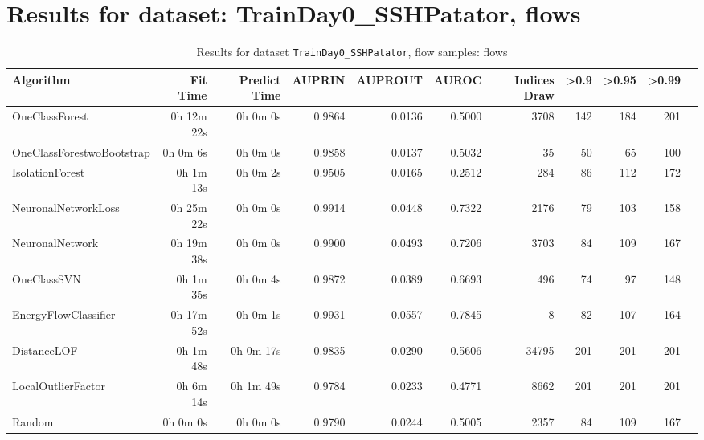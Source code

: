\documentclass{article}
\begin{document}
\section*{Results for dataset: TrainDay0_SSHPatator, flows}
\begin{table}[h!]
\centering
\caption{Results for dataset \texttt{TrainDay0_SSHPatator}, flow samples: flows}
\label{tab:trainday0sshpatator_flows}
\begin{tabular}{lrrrrrrrrrr}
\toprule
Algorithm & Fit Time & Predict Time & AUPRIN & AUPROUT & AUROC & Indices Draw & >0.9 & >0.95 & >0.99 \\
\midrule
OneClassForest & 0h 12m 22s & 0h 0m 0s & 0.9864 & 0.0136 & 0.5000 & 3708 & 142 & 184 & 201 \\
OneClassForestwoBootstrap & 0h 0m 6s & 0h 0m 0s & 0.9858 & 0.0137 & 0.5032 & 35 & 50 & 65 & 100 \\
IsolationForest & 0h 1m 13s & 0h 0m 2s & 0.9505 & 0.0165 & 0.2512 & 284 & 86 & 112 & 172 \\
NeuronalNetworkLoss & 0h 25m 22s & 0h 0m 0s & 0.9914 & 0.0448 & 0.7322 & 2176 & 79 & 103 & 158 \\
NeuronalNetwork & 0h 19m 38s & 0h 0m 0s & 0.9900 & 0.0493 & 0.7206 & 3703 & 84 & 109 & 167 \\
OneClassSVN & 0h 1m 35s & 0h 0m 4s & 0.9872 & 0.0389 & 0.6693 & 496 & 74 & 97 & 148 \\
EnergyFlowClassifier & 0h 17m 52s & 0h 0m 1s & 0.9931 & 0.0557 & 0.7845 & 8 & 82 & 107 & 164 \\
DistanceLOF & 0h 1m 48s & 0h 0m 17s & 0.9835 & 0.0290 & 0.5606 & 34795 & 201 & 201 & 201 \\
LocalOutlierFactor & 0h 6m 14s & 0h 1m 49s & 0.9784 & 0.0233 & 0.4771 & 8662 & 201 & 201 & 201 \\
Random & 0h 0m 0s & 0h 0m 0s & 0.9790 & 0.0244 & 0.5005 & 2357 & 84 & 109 & 167 \\
\bottomrule
\end{tabular}
\end{table}
\end{document}
